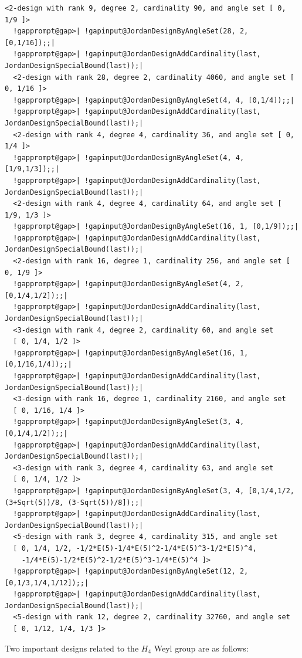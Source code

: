 \documentclass[a4paper,11pt]{report}
\begin{document}
{{\begin{Verbatim}[commandchars=!@|,fontsize=\small,frame=single,label=Example]
  <2-design with rank 9, degree 2, cardinality 90, and angle set [ 0, 1/9 ]>
  !gapprompt@gap>| !gapinput@JordanDesignByAngleSet(28, 2, [0,1/16]);;|
  !gapprompt@gap>| !gapinput@JordanDesignAddCardinality(last, JordanDesignSpecialBound(last));|
  <2-design with rank 28, degree 2, cardinality 4060, and angle set [ 0, 1/16 ]>
  !gapprompt@gap>| !gapinput@JordanDesignByAngleSet(4, 4, [0,1/4]);;|
  !gapprompt@gap>| !gapinput@JordanDesignAddCardinality(last, JordanDesignSpecialBound(last));|
  <2-design with rank 4, degree 4, cardinality 36, and angle set [ 0, 1/4 ]>
  !gapprompt@gap>| !gapinput@JordanDesignByAngleSet(4, 4, [1/9,1/3]);;|
  !gapprompt@gap>| !gapinput@JordanDesignAddCardinality(last, JordanDesignSpecialBound(last));|
  <2-design with rank 4, degree 4, cardinality 64, and angle set [ 1/9, 1/3 ]>
  !gapprompt@gap>| !gapinput@JordanDesignByAngleSet(16, 1, [0,1/9]);;|
  !gapprompt@gap>| !gapinput@JordanDesignAddCardinality(last, JordanDesignSpecialBound(last));|
  <2-design with rank 16, degree 1, cardinality 256, and angle set [ 0, 1/9 ]>
  !gapprompt@gap>| !gapinput@JordanDesignByAngleSet(4, 2, [0,1/4,1/2]);;|
  !gapprompt@gap>| !gapinput@JordanDesignAddCardinality(last, JordanDesignSpecialBound(last));|
  <3-design with rank 4, degree 2, cardinality 60, and angle set
  [ 0, 1/4, 1/2 ]>
  !gapprompt@gap>| !gapinput@JordanDesignByAngleSet(16, 1, [0,1/16,1/4]);;|
  !gapprompt@gap>| !gapinput@JordanDesignAddCardinality(last, JordanDesignSpecialBound(last));|
  <3-design with rank 16, degree 1, cardinality 2160, and angle set
  [ 0, 1/16, 1/4 ]>
  !gapprompt@gap>| !gapinput@JordanDesignByAngleSet(3, 4, [0,1/4,1/2]);;|
  !gapprompt@gap>| !gapinput@JordanDesignAddCardinality(last, JordanDesignSpecialBound(last));|
  <3-design with rank 3, degree 4, cardinality 63, and angle set
  [ 0, 1/4, 1/2 ]>
  !gapprompt@gap>| !gapinput@JordanDesignByAngleSet(3, 4, [0,1/4,1/2,(3+Sqrt(5))/8, (3-Sqrt(5))/8]);;|
  !gapprompt@gap>| !gapinput@JordanDesignAddCardinality(last, JordanDesignSpecialBound(last));|
  <5-design with rank 3, degree 4, cardinality 315, and angle set
  [ 0, 1/4, 1/2, -1/2*E(5)-1/4*E(5)^2-1/4*E(5)^3-1/2*E(5)^4,
    -1/4*E(5)-1/2*E(5)^2-1/2*E(5)^3-1/4*E(5)^4 ]>
  !gapprompt@gap>| !gapinput@JordanDesignByAngleSet(12, 2, [0,1/3,1/4,1/12]);;|
  !gapprompt@gap>| !gapinput@JordanDesignAddCardinality(last, JordanDesignSpecialBound(last));|
  <5-design with rank 12, degree 2, cardinality 32760, and angle set
  [ 0, 1/12, 1/4, 1/3 ]>
\end{Verbatim}
 Two important designs related to the $H_4$ Weyl group are as follows: 
}}
\end{document}
